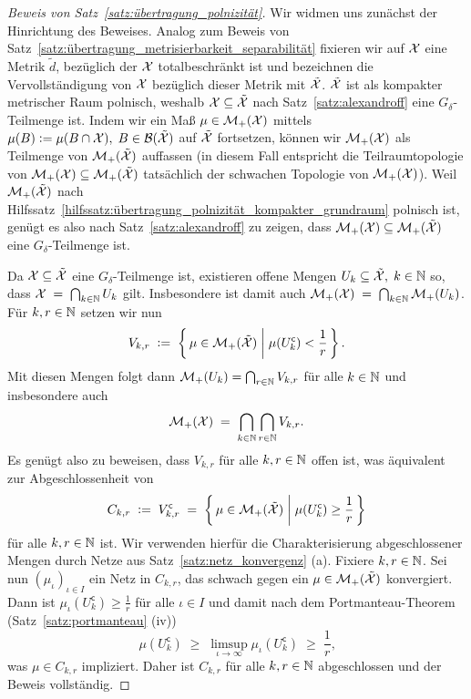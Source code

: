 \documentclass[../thesis/thesis.tex]{subfiles}
\begin{document}
	\begin{proof}[Beweis von Satz~\ref{satz:übertragung_polnizität}]
		Wir widmen uns zunächst der Hinrichtung des Beweises. Analog zum Beweis von Satz~\ref{satz:übertragung_metrisierbarkeit_separabilität} fixieren wir auf 
		$\mathcal{X}$ eine Metrik $\tilde{d}$, bezüglich der $\mathcal{X}$ totalbeschränkt ist und
		bezeichnen die Vervollständigung von $\mathcal{X}$ bezüglich dieser Metrik mit $\tilde{\mathcal{X}}$. $\tilde{\mathcal{X}}$ ist als kompakter metrischer Raum polnisch, weshalb $\mathcal{X} \subseteq \tilde{\mathcal{X}}$
		nach Satz~\ref{satz:alexandroff} eine $G_\delta$-Teilmenge ist. Indem wir ein Maß $\mu \in \mathcal{M}_{+}(\mathcal{X})$ mittels 
		$\mu(B) \vcentcolon = \mu(B \cap \mathcal{X}), \; B \in \mathcal{B}(\tilde{\mathcal{X}})$ auf $\tilde{\mathcal{X}}$ fortsetzen, können wir $\mathcal{M}_{+}(\mathcal{X})$ als Teilmenge von $\mathcal{M}_{+}(\tilde{\mathcal{X}})$
		auffassen (in diesem Fall entspricht die Teilraumtopologie von $\mathcal{M}_{+}(\mathcal{X}) \subseteq \mathcal{M}_{+}(\tilde{\mathcal{X}})$ tatsächlich der schwachen Topologie von $\mathcal{M}_{+}(\mathcal{X})$). Weil $\mathcal{M}_{+}(\tilde{\mathcal{X}})$ nach 
		Hilfssatz~\ref{hilfssatz:übertragung_polnizität_kompakter_grundraum} polnisch ist, genügt es also nach Satz~\ref{satz:alexandroff} zu zeigen, 
		dass $\mathcal{M}_{+}(\mathcal{X}) \subseteq \mathcal{M}_{+}(\tilde{\mathcal{X}})$ eine $G_\delta$-Teilmenge ist.
		
		Da $\mathcal{X} \subseteq \tilde{\mathcal{X}}$ eine $G_\delta$-Teilmenge ist, existieren offene Mengen $U_k \subseteq \tilde{\mathcal{X}}, \; k \in \mathbb{N}$ so, dass 
		$\mathcal{X} \; = \; \bigcap_{k \in \mathbb{N}} U_k$
		gilt. Insbesondere ist damit auch
		$\mathcal{M}_{+}(\mathcal{X}) \; = \; \bigcap_{k \in \mathbb{N}} \mathcal{M}_{+}(U_k)$.
		Für $k, r \in \mathbb{N}$ setzen wir nun
		\[ V_{k, r} \; \vcentcolon = \; \left\{\, \mu \in \mathcal{M}_{+}(\tilde{\mathcal{X}}) \; \middle| \; \mu(U_k^{\mathsf{c}}) < \frac{1}{r} \,\right\} \text{.} \]
		Mit diesen Mengen folgt dann $\mathcal{M}_{+}(U_k) = \bigcap_{r \in \mathbb{N}} V_{k, r}$ für alle $k \in \mathbb{N}$ und insbesondere auch
		\[ \mathcal{M}_{+}(\mathcal{X}) \; = \; \bigcap_{k \in \mathbb{N}} \bigcap_{r \in \mathbb{N}} V_{k, r} \text{.} \]
		Es genügt also zu beweisen, dass $V_{k, r}$ für alle $k, r \in \mathbb{N}$ offen ist, was äquivalent zur Abgeschlossenheit von 
		\[C_{k, r} \; \vcentcolon = \; V_{k, r}^{\mathsf{c}} \; = \; \left\{\, \mu \in \mathcal{M}_{+}(\tilde{\mathcal{X}}) \; \middle| \; \mu(U_k^{\mathsf{c}}) \geq \frac{1}{r} \,\right\} \] 
		für alle $k, r \in \mathbb{N}$ ist. Wir verwenden hierfür die Charakterisierung abgeschlossener Mengen durch Netze aus Satz~\ref{satz:netz_konvergenz} (a).
		Fixiere $k, r \in \mathbb{N}$. Sei nun $(\mu_\iota)_{\iota \in I}$ ein Netz in $C_{k, r}$, das schwach gegen ein $\mu \in \mathcal{M}_{+}(\tilde{\mathcal{X}})$ konvergiert.
		Dann ist $\mu_\iota(U_k^{\mathsf{c}}) \geq \frac{1}{r}$ für alle $\iota \in I$ und damit nach dem Portmanteau-Theorem (Satz~\ref{satz:portmanteau} (iv))
		\[ \mu(U_k^{\mathsf{c}}) \; \geq \; \limsup_{\iota \to \infty} \mu_\iota(U_k^{\mathsf{c}}) \; \geq \; \frac{1}{r} \text{,} \]
		was $\mu \in C_{k, r}$ impliziert. Daher ist $C_{k, r}$ für alle $k, r \in \mathbb{N}$ abgeschlossen und der Beweis vollständig.
		

\end{proof}
\end{document}
